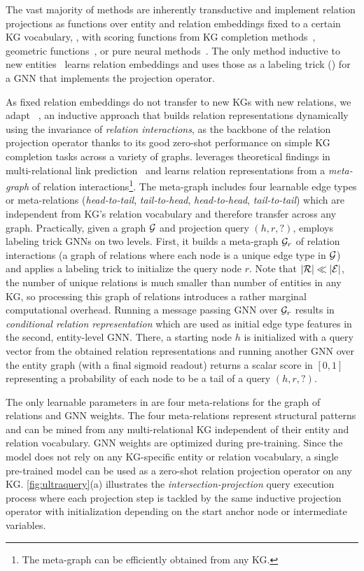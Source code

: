 The vast majority of \clqa methods are inherently transductive and implement relation projections as functions over entity and relation embeddings fixed to a certain KG vocabulary, \eg, with scoring functions from KG completion methods~\citep{gqe,cqd,qto}, geometric functions~\citep{q2b,cone}, or pure neural methods~\citep{mlpmix,lmpnn}.
The only method inductive to new entities~\citep{gnn_qe} learns relation embeddings and uses those as a labeling trick () for a GNN that implements the projection operator.

As fixed relation embeddings do not transfer to new KGs with new relations, 
we adapt \ultra~\citep{ultra}, an inductive approach that builds relation representations dynamically using the invariance of \emph{relation interactions}, as the backbone of the relation projection operator thanks to its good zero-shot performance on simple KG completion tasks across a variety of graphs.
\ultra leverages theoretical findings in multi-relational link prediction~\citep{rwl,rwl2} and learns relation representations from a \emph{meta-graph} of relation interactions\footnote{The meta-graph can be efficiently obtained from any KG.}.
The meta-graph includes four learnable edge types or meta-relations (\emph{head-to-tail}, \emph{tail-to-head}, \emph{head-to-head}, \emph{tail-to-tail}) which are independent from KG's relation vocabulary and therefore transfer across any graph.
Practically, given a graph ${\mathcal{G}}$ and projection query $(h, r, ?)$, \ultra employs labeling trick GNNs on two levels.
First, it builds a meta-graph ${\mathcal{G}}_r$ of relation interactions (a graph of relations where each node is a unique edge type in ${\mathcal{G}}$) and applies a labeling trick to initialize the query node $r$. 
Note that $|{\mathcal{R}}| \ll |{\mathcal{E}}|$, the number of unique relations is much smaller than number of entities in any KG, so processing this graph of relations introduces a rather marginal computational overhead.
Running a message passing GNN over ${\mathcal{G}}_r$ results in \emph{conditional relation representation} which are used as initial edge type features in the second, entity-level GNN.
There, a starting node $h$ is initialized with a query vector from the obtained relation representations and running another GNN over the entity graph (with a final sigmoid readout) returns a scalar score in $[0, 1]$ representing a probability of each node to be a tail of a query $(h,r,?)$.

The only learnable parameters in \ultra are four meta-relations for the graph of relations and GNN weights. The four meta-relations represent structural patterns 
and can be mined from any multi-relational KG independent of their entity and relation vocabulary. 
GNN weights are optimized during pre-training. Since the model does not rely on any KG-specific entity or relation vocabulary, a single pre-trained \ultra model can be used as a zero-shot relation projection operator on any KG. \autoref{fig:ultraquery}(a) illustrates the \emph{intersection-projection} query execution process where each projection step is tackled by the same inductive projection operator with initialization depending on the start anchor node or intermediate variables.

